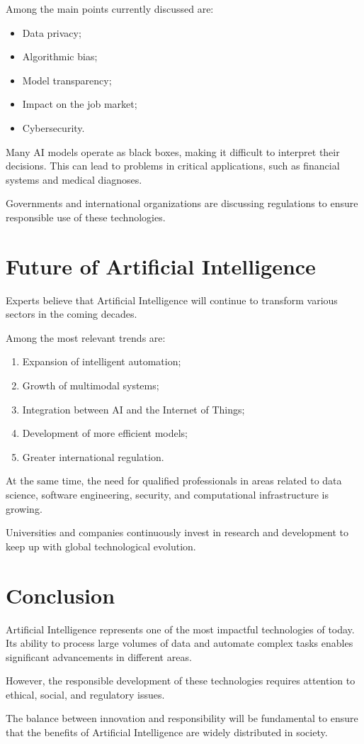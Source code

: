 \documentclass[11pt]{article}
\begin{document}
Among the main points currently discussed are:

\begin{itemize}
    \item Data privacy;
    \item Algorithmic bias;
    \item Model transparency;
    \item Impact on the job market;
    \item Cybersecurity.
\end{itemize}

Many AI models operate as black boxes, making it difficult to interpret their decisions.
This can lead to problems in critical applications, such as financial systems and medical
diagnoses.

Governments and international organizations are discussing regulations to ensure responsible
use of these technologies. 

\section{Future of Artificial Intelligence}

Experts believe that Artificial Intelligence will continue to transform various sectors
in the coming decades.

Among the most relevant trends are:

\begin{enumerate}
    \item Expansion of intelligent automation;
    \item Growth of multimodal systems;
    \item Integration between AI and the Internet of Things;
    \item Development of more efficient models;
    \item Greater international regulation.
\end{enumerate}

At the same time, the need for qualified professionals in areas related to
data science, software engineering, security, and computational infrastructure is growing.

Universities and companies continuously invest in research and development to
keep up with global technological evolution. 

\section{Conclusion}

Artificial Intelligence represents one of the most impactful technologies of today. Its ability to process large volumes of data and automate complex tasks enables significant advancements in different areas.

However, the responsible development of these technologies requires attention to ethical, social, and regulatory issues.

The balance between innovation and responsibility will be fundamental to ensure that the benefits of Artificial Intelligence are widely distributed in society.  
\end{document}
